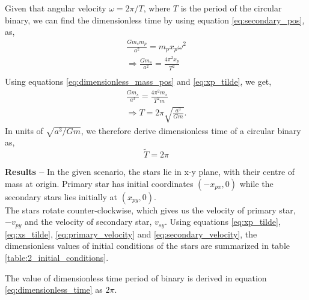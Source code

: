\documentclass[a4paper]{article}
\begin{document}
\begin{enumerate} [label*=\textbf{(\alph*)}]
				Given that angular velocity \(\omega = 2\pi / T\), where \(T\) is the period of the circular binary, we can find the dimensionless time by using equation \ref{eq:secondary_pos}, as,
				\begin{equation}
					\begin{gathered}
						\nonumber \frac{G m_s m_p}{a^2} = m_p x_p \omega^2 \\
						\Rightarrow \frac{G m_s}{a^2} = \frac{4 \pi^2 x_p}{T^2} \\
					\end{gathered}
				\end{equation}
				Using equations \ref{eq:dimensionless_mass_pos} and \ref{eq:xp_tilde}, we get,
				\begin{equation}
					\begin{gathered}
						\frac{G m_s}{a^3} = \frac{4 \pi^2 m_s}{T^2 m} \\
						\Rightarrow T = 2 \pi \sqrt{\frac{a^3}{Gm}}.
					\end{gathered}
				\end{equation}
				In units of \(\sqrt{a^3/Gm}\), we therefore derive dimensionless time of a circular binary as,
				\begin{equation}
					\tilde{T} = 2 \pi
					\label{eq:dimensionless_time}
				\end{equation}
				
				\subitem \textbf{Results  --}
				In the given scenario, the stars lie in x-y plane, with their centre of mass at origin. Primary star has initial coordinates \((-x_{px},0)\) while the secondary stars lies initially at \((x_{py},0)\).\\
				The stars rotate counter-clockwise, which gives us the velocity of primary star, \(-v_{py}\) and the velocity of secondary star, \(v_{sy}\).
				Using equations \ref{eq:xp_tilde}, \ref{eq:xs_tilde}, \ref{eq:primary_velocity} and \ref{eq:secondary_velocity}, the dimensionless values of initial conditions of the stars are summarized in table \ref{table:2_initial_conditions}.
				
				The value of dimensionless time period of binary is derived in equation \ref{eq:dimensionless_time} as \(2 \pi\).\\
				

\end{enumerate}
\end{document}
